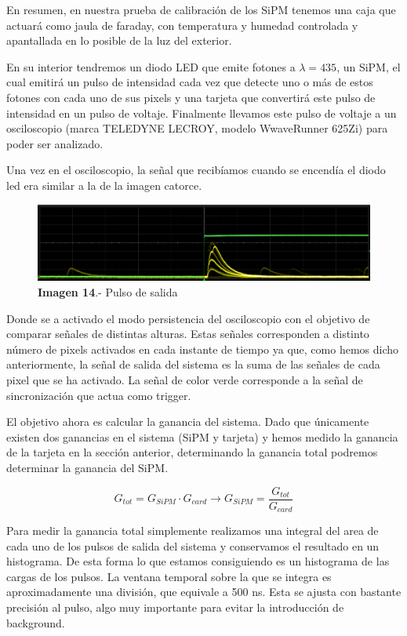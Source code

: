 En resumen, en nuestra prueba de calibración de los SiPM tenemos una caja que actuará como jaula de faraday, con temperatura y humedad controlada y apantallada en lo posible de la luz del exterior. 

En su interior tendremos un diodo LED que emite fotones a $\lambda=435$, un SiPM, el cual emitirá un pulso de intensidad cada vez que detecte uno o más de estos fotones con cada uno de sus pixels y una tarjeta que convertirá este pulso de intensidad en un pulso de voltaje. Finalmente llevamos este pulso de voltaje a un osciloscopio (marca TELEDYNE LECROY, modelo WwaveRunner 625Zi) para poder ser analizado. 

Una vez en el osciloscopio, la señal que recibíamos cuando se encendía el diodo led era similar a la de la imagen catorce.

\begin{figure}[hbtp]
\centering
\includegraphics[scale=0.2]{PulsoSalida.png}
\caption{\textbf{Imagen 14}.- Pulso de salida}
\end{figure}

Donde se a activado el modo persistencia del osciloscopio con el objetivo de comparar señales de distintas alturas. Estas señales corresponden a distinto número de pixels activados en cada instante de tiempo ya que, como hemos dicho anteriormente, la señal de salida del sistema es la suma de las señales de cada pixel que se ha activado. La señal de color verde corresponde a la señal de sincronización que actua como trigger.

El objetivo ahora es calcular la ganancia del sistema. Dado que únicamente existen dos ganancias en el sistema (SiPM y tarjeta) y hemos medido la ganancia de la tarjeta en la sección anterior, determinando la ganancia total podremos determinar la ganancia del SiPM. 

$$G_{tot}=G_{SiPM} \cdotp G_{card} \longrightarrow G_{SiPM} = \frac{G_{tot}}{G_{card}}$$

Para medir la ganancia total simplemente realizamos una integral del area de cada uno de los pulsos de salida del sistema y conservamos el resultado en un histograma. De esta forma lo que estamos consiguiendo es un histograma de las cargas de los pulsos. La ventana temporal sobre la que se integra es aproximadamente una división, que equivale a 500 ns. Esta se ajusta con bastante precisión al pulso, algo muy importante para evitar la introducción de background.

